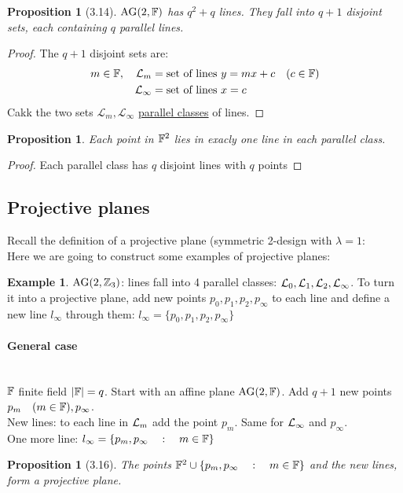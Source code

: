 \documentclass[]{article}
\newtheorem{prop}[thm]{Proposition}
\theoremstyle{definition}
\newtheorem*{exmp}{Example}
\theoremstyle{remark}
\numberwithin{equation}{section}
\begin{document}
			\begin{prop}[3.14]
				 $\text{AG}(2,\mathbb F)$ has $q^2 + q$ lines. They fall into $q+1$ disjoint sets, each containing $q$ parallel lines.
			\end{prop}

			\begin{proof}
				The $q+1$ disjoint sets are:
				\begin{align*}
					m \in \mathbb F, \quad \mathcal{L}_m &= \text{set of lines $y = mx + c$} \quad (c \in \mathbb F)\\
					\mathcal{L}_{\infty} &= \text{set of lines $x= c$}
				\end{align*}
				Cakk the two sets $\mathcal{L}_m, \mathcal{L}_{\infty}$ \underline{parallel classes} of lines.
			\end{proof}

			\begin{prop}
				Each point in $\mathbb F^2$ lies in exacly one line in each parallel class.
			\end{prop}

			\begin{proof}
				Each parallel class has $q$ disjoint lines with $q$ points
			\end{proof}
		\subsection*{Projective planes}
			Recall the definition of a projective plane (symmetric 2-design with  $\lambda=1$:\\
			Here we are going to construct some examples of projective planes:
			\begin{exmp}
				$\text{AG}(2,\mathbb{Z}_3)$: lines fall into 4 parallel classes: $\mathcal{L}_0, \mathcal{L}_1, \mathcal{L}_2, \mathcal{L}_{\infty}$. To turn it into a projective plane, add new points $p_0, p_1, p_2, p_{\infty}$ to each line and define a new line $l_{\infty}$ through them: $l_\infty = \{p_0, p_1, p_2, p_\infty \}$
			\end{exmp}

			\paragraph*{General case}\hfill\\
				$\mathbb F$ finite field $|\mathbb F| = q$. Start with an affine plane $\text{AG}(2,\mathbb F)$. Add $q+1$ new points $p_m\quad(m \in \mathbb F), p_\infty$.\\
				New lines: to each line in $\mathcal{L}_m$ add the point $p_m$. Same for $\mathcal{L}_\infty$ and $p_\infty$.\\
				One more line: $l_\infty = \{p_m, p_\infty \quad: \quad m \in \mathbb F\}$
			\begin{prop}[3.16]
				The points $\mathbb F^2 \cup \{p_m, p_\infty \quad: \quad m \in \mathbb F\}$ and the new lines, form a projective plane.
			\end{prop}
\end{document}

